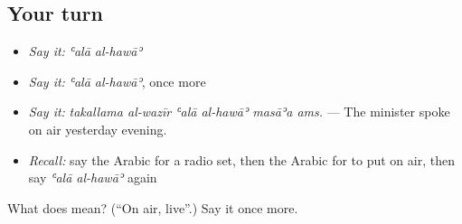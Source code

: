 \subsection*{Your turn}
\begin{itemize}
\raggedright
  \item \emph{Say it:} \emph{ʿalā al-hawāʾ}
  \item \emph{Say it:} \emph{ʿalā al-hawāʾ}, once more
  \item \emph{Say it:} \emph{takallama al-wazīr ʿalā al-hawāʾ masāʾa ams.} — The minister spoke on air yesterday evening.
  \item \emph{Recall:} say the Arabic for a radio set, then the Arabic for to put on air, then say \emph{ʿalā al-hawāʾ} again
\end{itemize}

\begin{tcolorbox}[breakable,colback=teal!4,colframe=teal!35!black,title={Before you move on}]
What does   mean? (\textquotedblleft{}On air, live\textquotedblright{}.) Say it once more.
\end{tcolorbox}
